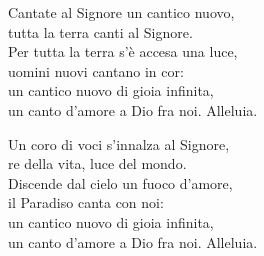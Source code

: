 

\spazio

\strofa Cantate al Signore un cantico nuovo,\\
tutta la terra canti al Signore.\\
Per tutta la terra s'è accesa una luce,\\
uomini nuovi cantano in cor:\\
un cantico nuovo di gioia infinita,\\
un canto d'amore a Dio fra noi. Alleluia.

\spazio


\spazio

\strofa Un coro di voci s'innalza al Signore,\\
re della vita, luce del mondo.\\
Discende dal cielo un fuoco d'amore,\\
il Paradiso canta con noi:\\
un cantico nuovo di gioia infinita,\\
un canto d'amore a Dio fra noi. Alleluia.

\spazio

